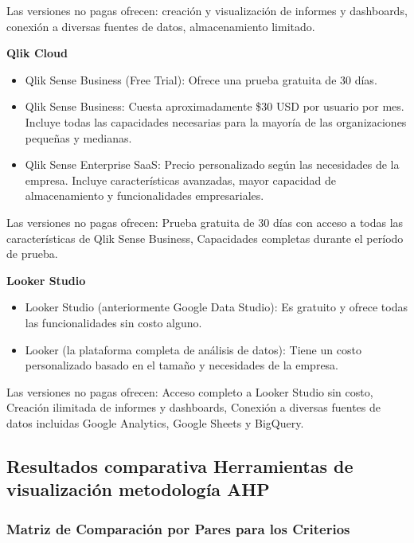 \documentclass[
  11pt,
  bookmarksnumbered]{article}
\begin{document}
Las versiones no pagas ofrecen: creación y visualización de informes y dashboards, conexión a diversas fuentes de datos, almacenamiento limitado.

\textbf{Qlik Cloud}

\begin{itemize}
\item
  Qlik Sense Business (Free Trial): Ofrece una prueba gratuita de 30 días.
\item
  Qlik Sense Business: Cuesta aproximadamente \$30 USD por usuario por mes. Incluye todas las capacidades necesarias para la mayoría de las organizaciones pequeñas y medianas.
\item
  Qlik Sense Enterprise SaaS: Precio personalizado según las necesidades de la empresa. Incluye características avanzadas, mayor capacidad de almacenamiento y funcionalidades empresariales.
\end{itemize}

Las versiones no pagas ofrecen: Prueba gratuita de 30 días con acceso a todas las características de Qlik Sense Business, Capacidades completas durante el período de prueba.

\textbf{Looker Studio}

\begin{itemize}
\item
  Looker Studio (anteriormente Google Data Studio): Es gratuito y ofrece todas las funcionalidades sin costo alguno.
\item
  Looker (la plataforma completa de análisis de datos): Tiene un costo personalizado basado en el tamaño y necesidades de la empresa.
\end{itemize}

Las versiones no pagas ofrecen: Acceso completo a Looker Studio sin costo, Creación ilimitada de informes y dashboards, Conexión a diversas fuentes de datos incluidas Google Analytics, Google Sheets y BigQuery.

\newpage

\hypertarget{resultados-comparativa-herramientas-de-visualizaciuxf3n-metodologuxeda-ahp}{%
\subsection{Resultados comparativa Herramientas de visualización metodología AHP}\label{resultados-comparativa-herramientas-de-visualizaciuxf3n-metodologuxeda-ahp}}

\hypertarget{matriz-de-comparaciuxf3n-por-pares-para-los-criterios}{%
\subsubsection{Matriz de Comparación por Pares para los Criterios}\label{matriz-de-comparaciuxf3n-por-pares-para-los-criterios}}
\end{document}
